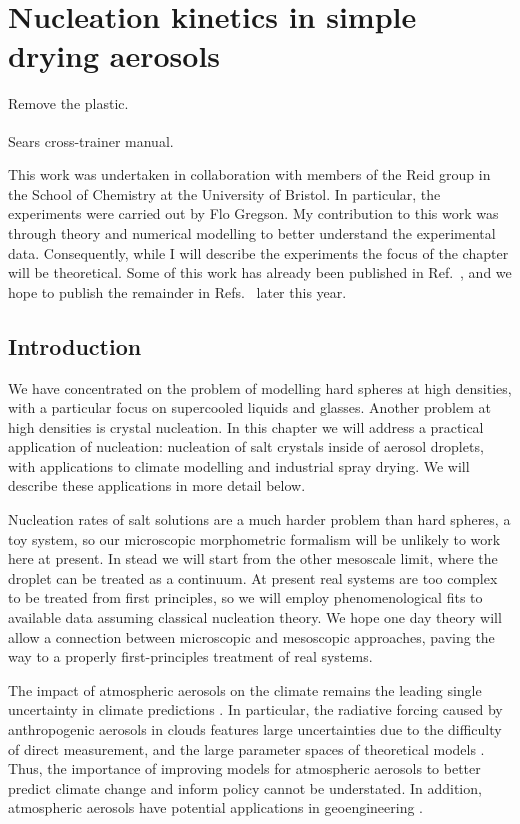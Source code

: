 \documentclass[11pt,twoside]{report}
\begin{document}
\chapter{Nucleation kinetics in simple drying aerosols}
\epigraph{Remove the plastic.}{Sears\textsuperscript{\textregistered} cross-trainer manual.}
\label{chapter:aerosols}

This work was undertaken in collaboration with members of the Reid group in the School of Chemistry at the University of Bristol.
In particular, the experiments were carried out by Flo Gregson.
My contribution to this work was through theory and numerical modelling to better understand the experimental data.
Consequently, while I will describe the experiments the focus of the chapter will be theoretical.
Some of this work has already been published in Ref.\ \cite{GregsonJPCB2019}, and we hope to publish the remainder in Refs.\ \cite{RobinsonTBD2019,GregsonTBD2019} later this year.

\section{Introduction}

We have concentrated on the problem of modelling hard spheres at high densities, with a particular focus on supercooled liquids and glasses.
Another problem at high densities is crystal nucleation.
In this chapter we will address a practical application of nucleation: nucleation of salt crystals inside of aerosol droplets, with applications to climate modelling and industrial spray drying.
We will describe these applications in more detail below.

Nucleation rates of salt solutions are a much harder problem than hard spheres, a toy system, so our microscopic morphometric formalism will be unlikely to work here at present.
In stead we will start from the other mesoscale limit, where the droplet can be treated as a continuum.
At present real systems are too complex to be treated from first principles, so we will employ phenomenological fits to available data assuming classical nucleation theory.
We hope one day theory will allow a connection between microscopic and mesoscopic approaches, paving the way to a properly first-principles treatment of real systems.

The impact of atmospheric aerosols on the climate remains the leading single uncertainty in climate predictions \cite{BoucherIPCC2013,CarslawN2013,LeePNAS2016,RegayreACP2018}.
In particular, the radiative forcing caused by anthropogenic aerosols in clouds features large uncertainties due to the difficulty of direct measurement, and the large parameter spaces of theoretical models \cite{LeePNAS2016}.
Thus, the importance of improving models for atmospheric aerosols to better predict climate change and inform policy cannot be understated.
In addition, atmospheric aerosols have potential applications in geoengineering \cite{PringleACP2012}.
\end{document}
